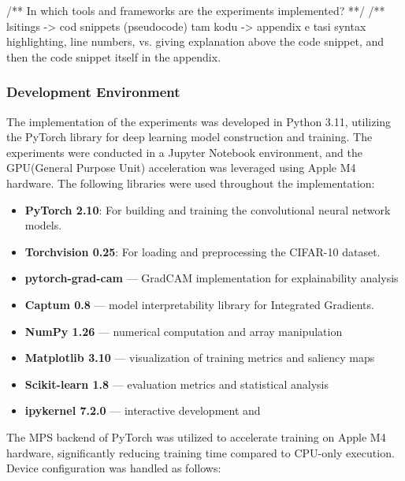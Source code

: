 /** In which tools and frameworks are the experiments implemented? **/
/** lsitings -> cod snippets (pseudocode) tam kodu -> appendix e tasi
syntax highlighting, line numbers, vs.
giving explanation above the code snippet, and then the code snippet itself in the appendix.

\subsubsection{Development Environment}
The implementation of the experiments was developed in Python 3.11, utilizing the PyTorch library for deep learning model construction and training. The experiments were conducted in a Jupyter Notebook environment, and the GPU(General Purpose Unit) acceleration was leveraged using Apple M4 hardware. The following libraries were used throughout the implementation:
\begin{itemize}
    \item \textbf{PyTorch 2.10}: For building and training the convolutional neural network models.
    \item \textbf{Torchvision 0.25}: For loading and preprocessing the CIFAR-10 dataset.
    \item \textbf{pytorch-grad-cam} — GradCAM implementation 
    for explainability analysis
    \item \textbf{Captum 0.8} — model interpretability 
    library for Integrated Gradients.
    \item \textbf{NumPy 1.26} — numerical computation 
    and array manipulation
    \item \textbf{Matplotlib 3.10} — visualization of 
    training metrics and saliency maps
    \item \textbf{Scikit-learn 1.8} — evaluation metrics 
    and statistical analysis
    \item \textbf{ipykernel 7.2.0} — interactive development and

\end{itemize}

The MPS backend of PyTorch was utilized to accelerate training on Apple M4 hardware, significantly reducing training time compared to CPU-only execution. Device configuration was handled as follows:


















